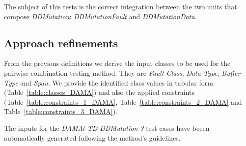 The subject of this tests is the correct integration between the two units that compose \emph{DDMutation}: \emph{DDMutationFault} and \emph{DDMutationData}.

\subsection{Approach refinements}
%
From the previous definitions we derive the input classes to be used for the pairwise combination testing method.
They are \emph{Fault Class}, \emph{Data Type}, \emph{Buffer Type} and \emph{Span}.
We provide the identified class values in tabular form (Table~\ref{table:classes_DAMA}) and also the applied constraints (Table~\ref{table:constraints_1_DAMA}, Table~\ref{table:constraints_2_DAMA}
 and Table~\ref{table:constraints_3_DAMA}).

The inputs for the \emph{DAMAt-TD-DDMutation-3} test cases have beeen automatically generated following the method's guidelines.




